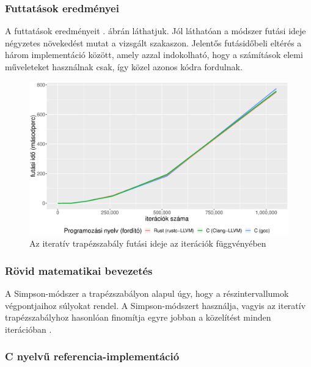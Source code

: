 \subsubsection{Futtatások eredményei}

A futtatások eredményeit . ábrán láthatjuk. Jól láthatóan a módszer futási ideje négyzetes növekedést mutat a vizsgált szakaszon. Jelentős futásidőbeli eltérés a három implementáció között, amely azzal indokolható, hogy a számítások elemi műveleteket használnak csak, így közel azonos kódra fordulnak.

\begin{figure}[h!]
\centering
\includegraphics[width=15.5cm]{kepek/trapedozial_rule_run.eps}
\caption{Az iteratív trapézszabály futási ideje az iterációk függvényében}
\label{fig:iterative_trapez}
\end{figure}


\subsubsection{Rövid matematikai bevezetés}

A Simpson-módszer a trapézszabályon alapul úgy, hogy a részintervallumok végpontjaihoz súlyokat rendel. A Simpson-módszert használja, vagyis az iteratív trapézszabályhoz hasonlóan finomítja egyre jobban a közelítést minden iterációban \cite{simpson}.

\subsubsection{C nyelvű referencia-implementáció}

